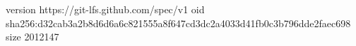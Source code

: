 version https://git-lfs.github.com/spec/v1
oid sha256:d32cab3a2b8d6d6a6c821555a8f647cd3dc2a4033d41fb0c3b796dde2faec698
size 2012147
